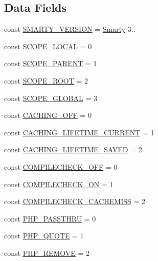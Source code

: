 \subsection*{Data Fields}
\begin{DoxyCompactItemize}
\item 
const \hyperlink{class_smarty_a38a3b7b2e496b24a1bf2976ac1552ed7}{S\+M\+A\+R\+T\+Y\+\_\+\+V\+E\+R\+S\+I\+O\+N} = \textquotesingle{}\hyperlink{class_smarty}{Smarty}-\/3..\textquotesingle{}
\item 
const \hyperlink{class_smarty_ae96cd6e8d429b91e56cd1914c5b5ce61}{S\+C\+O\+P\+E\+\_\+\+L\+O\+C\+A\+L} = 0
\item 
const \hyperlink{class_smarty_a8ea89b5e55b135aa28fcccba189e3bca}{S\+C\+O\+P\+E\+\_\+\+P\+A\+R\+E\+N\+T} = 1
\item 
const \hyperlink{class_smarty_a18f8c264effd9f09a2776427cbc2d005}{S\+C\+O\+P\+E\+\_\+\+R\+O\+O\+T} = 2
\item 
const \hyperlink{class_smarty_ab445d8c60ac47e2eade1790d3b5ead7e}{S\+C\+O\+P\+E\+\_\+\+G\+L\+O\+B\+A\+L} = 3
\item 
const \hyperlink{class_smarty_a494d9102d5d9efc9f8c858c21dd57347}{C\+A\+C\+H\+I\+N\+G\+\_\+\+O\+F\+F} = 0
\item 
const \hyperlink{class_smarty_acb47fdccfbe5022bea1ecfcf8e9c6533}{C\+A\+C\+H\+I\+N\+G\+\_\+\+L\+I\+F\+E\+T\+I\+M\+E\+\_\+\+C\+U\+R\+R\+E\+N\+T} = 1
\item 
const \hyperlink{class_smarty_a3ddb606194b408a8ed1fa13e86156357}{C\+A\+C\+H\+I\+N\+G\+\_\+\+L\+I\+F\+E\+T\+I\+M\+E\+\_\+\+S\+A\+V\+E\+D} = 2
\item 
const \hyperlink{class_smarty_a22c112cddd1e27f2bf70cf574c85f56a}{C\+O\+M\+P\+I\+L\+E\+C\+H\+E\+C\+K\+\_\+\+O\+F\+F} = 0
\item 
const \hyperlink{class_smarty_a65fdfe500b2118e0c0b64cc6372627db}{C\+O\+M\+P\+I\+L\+E\+C\+H\+E\+C\+K\+\_\+\+O\+N} = 1
\item 
const \hyperlink{class_smarty_aaafe5f30bf960deb3e2b6dbc0d7878aa}{C\+O\+M\+P\+I\+L\+E\+C\+H\+E\+C\+K\+\_\+\+C\+A\+C\+H\+E\+M\+I\+S\+S} = 2
\item 
const \hyperlink{class_smarty_a5ffae087be1c42146449529dcc03524f}{P\+H\+P\+\_\+\+P\+A\+S\+S\+T\+H\+R\+U} = 0
\item 
const \hyperlink{class_smarty_ab9f2e77d0c6d296834391a411e880ae0}{P\+H\+P\+\_\+\+Q\+U\+O\+T\+E} = 1
\item 
const \hyperlink{class_smarty_a86dc83caae5f5b2b3a41d400727df9f9}{P\+H\+P\+\_\+\+R\+E\+M\+O\+V\+E} = 2

\end{DoxyCompactItemize}
